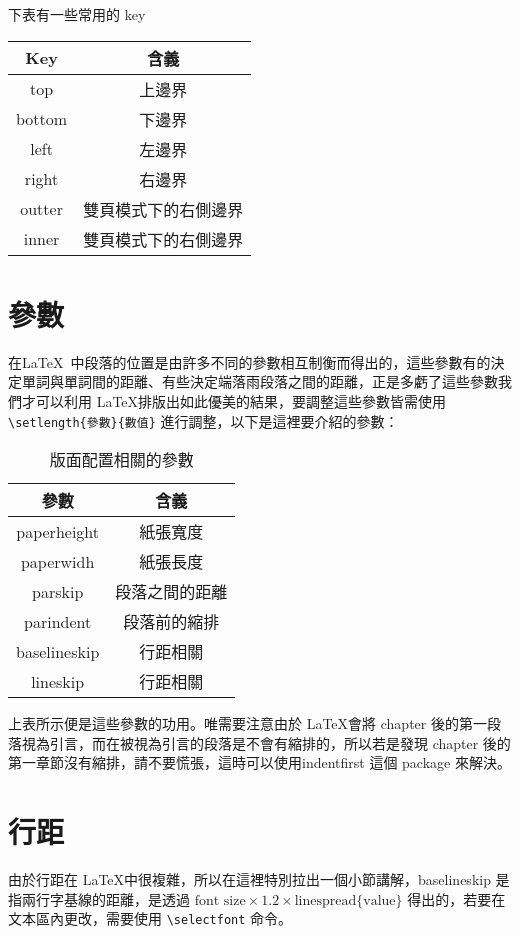 下表有一些常用的 key

\begin{tabular}{cc}
\hline
Key & 含義 \\\hline\hline
top & 上邊界 \\\hline
bottom & 下邊界 \\\hline
left & 左邊界 \\\hline
right & 右邊界 \\\hline
outter & 雙頁模式下的右側邊界 \\\hline
inner & 雙頁模式下的右側邊界 \\\hline
\end{tabular}

\section{參數}

在\LaTeX\ 中段落的位置是由許多不同的參數相互制衡而得出的，這些參數有的決定單詞與單詞間的距離、有些決定端落雨段落之間的距離，正是多虧了這些參數我們才可以利用 \LaTeX 排版出如此優美的結果，要調整這些參數皆需使用 \verb|\setlength{參數}{數值}| 進行調整，以下是這裡要介紹的參數：

\begin{table}[hbt]
\begin{tabular}{|c|c|}
\hline
參數 & 含義
\\\hline\hline
paperheight & 紙張寬度
\\\hline
paperwidh & 紙張長度
\\\hline
parskip & 段落之間的距離
\\\hline
parindent & 段落前的縮排
\\\hline
baselineskip & 行距相關
\\\hline
lineskip & 行距相關
\\\hline
\end{tabular}
\caption{版面配置相關的參數}
\label{tab:layout}
\end{table}

上表所示便是這些參數的功用。唯需要注意由於 \LaTeX 會將 chapter 後的第一段落視為引言，而在被視為引言的段落是不會有縮排的，所以若是發現 chapter 後的第一章節沒有縮排，請不要慌張，這時可以使用indentfirst 這個 package 來解決。

\section{行距}

由於行距在 \LaTeX 中很複雜，所以在這裡特別拉出一個小節講解，baselineskip 是指兩行字基線的距離，是透過 $\text{font size} \times 1.2 \times \text{linespread\{value\}}$ 得出的，若要在文本區內更改，需要使用 \verb|\selectfont| 命令。

